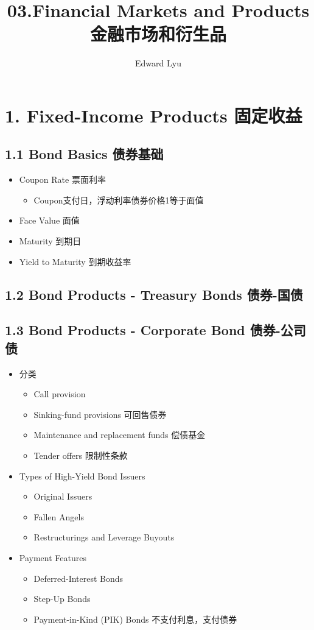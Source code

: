 \documentclass[a4paper,6pt,twoside,openany]{article}
\title{03.Financial Markets and Products \\ 金融市场和衍生品}
\author{Edward Lyu}
\begin{document}
\maketitle
\section*{1. Fixed-Income Products 固定收益}
\subsection*{1.1 Bond Basics 债券基础}
\begin{itemize}
\item Coupon Rate 票面利率
  \begin{itemize}
  \item Coupon支付日，浮动利率债券价格1等于面值
  \end{itemize}
\item Face Value 面值
\item Maturity 到期日
\item Yield to Maturity 到期收益率
\end{itemize}
\subsection*{1.2 Bond Products - Treasury Bonds 债券-国债}
\subsection*{1.3 Bond Products - Corporate Bond 债券-公司债}
\begin{itemize}
\item 分类
  \begin{itemize}
  \item Call provision
  \item Sinking-fund provisions 可回售债券
  \item Maintenance and replacement funds 偿债基金
  \item Tender offers 限制性条款
  \end{itemize}
\item Types of High-Yield Bond Issuers
  \begin{itemize}
  \item Original Issuers
  \item Fallen Angels
  \item Restructurings and Leverage Buyouts
  \end{itemize}
\item Payment Features
  \begin{itemize}
  \item Deferred-Interest Bonds
  \item Step-Up Bonds
  \item Payment-in-Kind (PIK) Bonds 不支付利息，支付债券
  \end{itemize}
\end{itemize}
\end{document}
